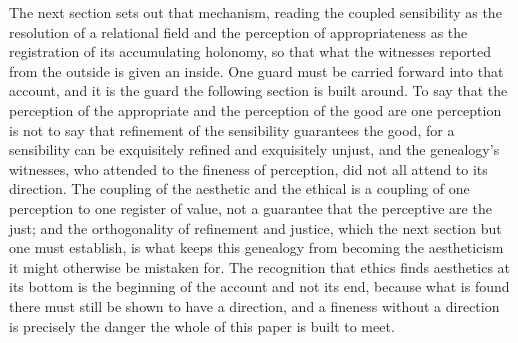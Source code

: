 The next section sets out that mechanism, reading the coupled sensibility as the resolution of a relational field and the perception of appropriateness as the registration of its accumulating holonomy, so that what the witnesses reported from the outside is given an inside. One guard must be carried forward into that account, and it is the guard the following section is built around. To say that the perception of the appropriate and the perception of the good are one perception is not to say that refinement of the sensibility guarantees the good, for a sensibility can be exquisitely refined and exquisitely unjust, and the genealogy's witnesses, who attended to the fineness of perception, did not all attend to its direction. The coupling of the aesthetic and the ethical is a coupling of one perception to one register of value, not a guarantee that the perceptive are the just; and the orthogonality of refinement and justice, which the next section but one must establish, is what keeps this genealogy from becoming the aestheticism it might otherwise be mistaken for. The recognition that ethics finds aesthetics at its bottom is the beginning of the account and not its end, because what is found there must still be shown to have a direction, and a fineness without a direction is precisely the danger the whole of this paper is built to meet.
